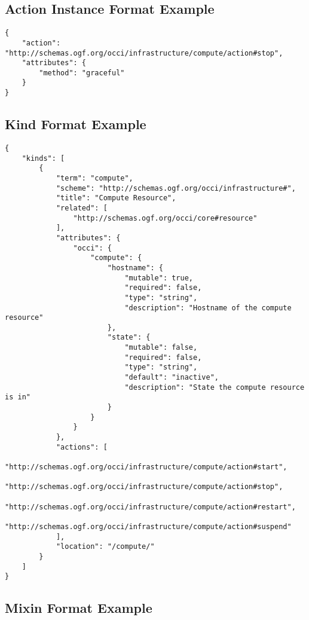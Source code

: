 \documentclass[10pt,a4paper]{article}
\begin{document}
\subsection{Action Instance Format Example}
\label{sec:example_action_instance}

\begin{lstlisting}
{
    "action": "http://schemas.ogf.org/occi/infrastructure/compute/action#stop",
    "attributes": {
        "method": "graceful"       
    }
}
\end{lstlisting}

\subsection{Kind Format Example}
\label{sec:example_kind}

\begin{lstlisting}
{
    "kinds": [
        {
            "term": "compute",
            "scheme": "http://schemas.ogf.org/occi/infrastructure#",
            "title": "Compute Resource",
            "related": [
                "http://schemas.ogf.org/occi/core#resource"
            ],
            "attributes": {
                "occi": {
                    "compute": {
                        "hostname": {
                            "mutable": true,
                            "required": false,
                            "type": "string",
                            "description": "Hostname of the compute resource"
                        },
                        "state": {
                            "mutable": false,
                            "required": false,
                            "type": "string",
                            "default": "inactive",
                            "description": "State the compute resource is in"
                        }
                    }
                }
            },
            "actions": [
                "http://schemas.ogf.org/occi/infrastructure/compute/action#start",
                "http://schemas.ogf.org/occi/infrastructure/compute/action#stop",
                "http://schemas.ogf.org/occi/infrastructure/compute/action#restart",
                "http://schemas.ogf.org/occi/infrastructure/compute/action#suspend"
            ],
            "location": "/compute/"
        }
    ]
}
\end{lstlisting}

\subsection{Mixin Format Example}
\label{sec:example_mixin}
\end{document}
